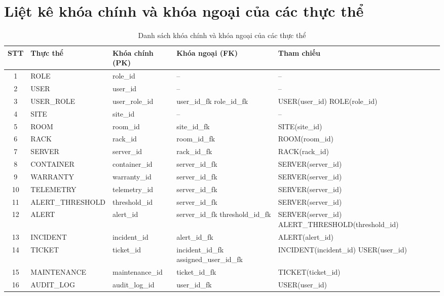 \newpage
\section{Liệt kê khóa chính và khóa ngoại của các thực thể}

\small
\setlength\tabcolsep{4pt}
\begin{longtable}{|c|>{\raggedright\arraybackslash}p{2.8cm}|>{\raggedright\arraybackslash}p{2.6cm}|>{\raggedright\arraybackslash}p{3.1cm}|>{\raggedright\arraybackslash}p{4.2cm}|}
\caption{Danh sách khóa chính và khóa ngoại của các thực thể} \label{tab:pk_fk_c3} \\
\hline
\textbf{STT} & \textbf{Thực thể} & \textbf{Khóa chính (PK)} & \textbf{Khóa ngoại (FK)} & \textbf{Tham chiếu} \\ \hline
\endhead

1 & ROLE & role\_id & -- & -- \\ \hline
2 & USER & user\_id & -- & -- \\ \hline
3 & USER\_ROLE & user\_role\_id & user\_id\_fk \newline role\_id\_fk & USER(user\_id) \newline ROLE(role\_id) \\ \hline
4 & SITE & site\_id & -- & -- \\ \hline
5 & ROOM & room\_id & site\_id\_fk & SITE(site\_id) \\ \hline
6 & RACK & rack\_id & room\_id\_fk & ROOM(room\_id) \\ \hline
7 & SERVER & server\_id & rack\_id\_fk & RACK(rack\_id) \\ \hline
8 & CONTAINER & container\_id & server\_id\_fk & SERVER(server\_id) \\ \hline
9 & WARRANTY & warranty\_id & server\_id\_fk & SERVER(server\_id) \\ \hline
10 & TELEMETRY & telemetry\_id & server\_id\_fk & SERVER(server\_id) \\ \hline
11 & ALERT\_THRESHOLD & threshold\_id & server\_id\_fk & SERVER(server\_id) \\ \hline
12 & ALERT & alert\_id & server\_id\_fk \newline threshold\_id\_fk & SERVER(server\_id) \newline ALERT\_THRESHOLD(threshold\_id) \\ \hline
13 & INCIDENT & incident\_id & alert\_id\_fk & ALERT(alert\_id) \\ \hline
14 & TICKET & ticket\_id & incident\_id\_fk \newline assigned\_user\_id\_fk & INCIDENT(incident\_id) \newline USER(user\_id) \\ \hline
15 & MAINTENANCE & maintenance\_id & ticket\_id\_fk & TICKET(ticket\_id) \\ \hline
16 & AUDIT\_LOG & audit\_log\_id & user\_id\_fk & USER(user\_id) \\ \hline
\end{longtable}

